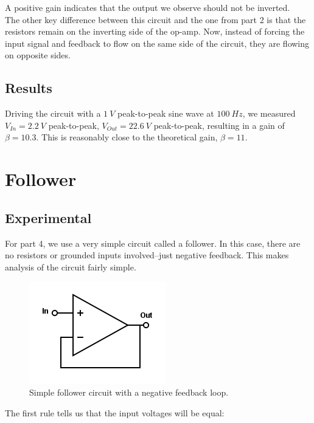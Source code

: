 \documentclass[11pt]{article}
\begin{document}
A positive gain indicates that the output we observe should not be inverted.\\

The other key difference between this circuit and the one from part 2 is that the resistors remain on the inverting side of the op-amp. Now, instead of forcing the input signal and feedback to flow on the same side of the circuit, they are flowing on opposite sides.\\


\subsection{Results}

Driving the circuit with a $1\ V$ peak-to-peak sine wave at $100\ Hz$, we measured $V_{In} = 2.2\ V$ peak-to-peak, $V_{Out} = 22.6\ V$ peak-to-peak, resulting in a gain of $\beta = 10.3$. This is reasonably close to the theoretical gain, $\beta = 11$.\\


\section{Follower}
\subsection{Experimental}

For part 4, we use a very simple circuit called a follower. In this case, there are no resistors or grounded inputs involved--just negative feedback. This makes analysis of the circuit fairly simple.\\

\begin{figure}[H]
    \centering
    \includegraphics[scale=0.5]{Diagrams/c-d.png}
    \caption{Simple follower circuit with a negative feedback loop.}
    \label{circuit:d}
\end{figure}

The first rule tells us that the input voltages will be equal:\\
\end{document}
